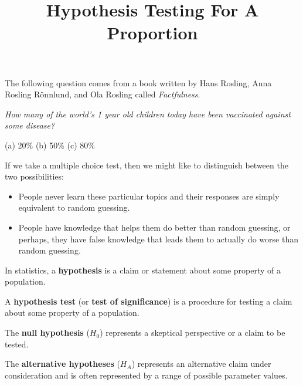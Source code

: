 \documentclass{beamer}
\title[MA205 - Section 5.3]{Hypothesis Testing For A Proportion}
\begin{document}
\begin{frame}
  \titlepage
\end{frame}

\begin{frame}
  \begin{example}\label{infant vaccination}
    \vspace{-2mm} %
    The following question comes from a book written by Hans Rosling, Anna Rosling R\"{o}nnlund, and Ola Rosling called \emph{Factfulness}.

    \vspace{1mm}
    \emph{How many of the world's 1 year old children today have been vaccinated against some disease?}

    \vspace{-2.5mm}
    \begin{center}
      (a) 20\%
      \qquad\quad
      (b) 50\%
      \qquad\quad
      (c) 80\%
    \end{center}

    \vspace{-2.5mm}
    \pause
    \pause
  \end{example}
  
  \begin{note}
    If we take a multiple choice test, then we might like to distinguish between the two possibilities:
    \begin{itemize}
    \item People never learn these particular topics and their responses are simply equivalent to random guessing.
    \item People have knowledge that helps them do better than random guessing, or perhaps, they have false knowledge that leads them to actually do worse than random guessing.
    \end{itemize}
  \end{note}
\end{frame}

\begin{frame}
\begin{definition}
In statistics, a \textbf{hypothesis} is a claim or statement about some property of a population.
\end{definition}\pause

\begin{definition}
A \textbf{hypothesis test} (or \textbf{test of significance}) is a procedure for testing a claim about some property of a population.
\end{definition}\pause

\begin{definition}
The \textbf{null hypothesis} ($H_0$) represents a skeptical perspective or a claim to be tested.
\end{definition}\pause

\begin{definition}
The \textbf{alternative hypotheses} ($H_A$) represents an alternative claim under consideration and is often represented by a range of possible parameter values.
\end{definition}
\end{frame}
\end{document}
